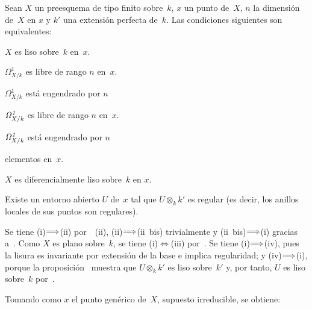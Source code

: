 \begin{theoreme}
\label{II.5.5}
Sean $X$ un preesquema de tipo finito sobre~$k$, $x$ un punto de~$X$, $n$ la dimensión de~$X$ en $x$ y $k'$ una extensión perfecta de~$k$. Las condiciones siguientes son equivalentes:
\begin{enumerate}
\item[(i)] $X$ es liso sobre~$k$ en~$x$.
{\item[(ii)] $\Omega_{X/k}^1$ es libre de rango $n$ en~$x$.
\item[(ii~bis)] $\Omega_{X/k}^1$ está engendrado por $n$}
{\item[(ii)] $\it{\Omega}_{X/k}^1$ es libre de rango $n$ en~$x$.
\item[(ii~bis)] $\it{\Omega}_{X/k}^1$ está engendrado por $n$}
elementos en~$x$.
\item[(iii)] $X$ es diferencialmente liso sobre~$k$ en $x$.
\item[(iv)] Existe un entorno abierto $U$ de~$x$ tal que $U\otimes_k k'$ es regular (es decir, los anillos locales de sus puntos son regulares).
\end{enumerate}
\end{theoreme}

Se tiene (i)$\Longrightarrow$(ii) por~~(ii), (ii)$\Longrightarrow$(ii~bis) trivialmente y (ii~bis)$\Longrightarrow$(i) gracias a~. Como $X$ es plano sobre~$k$, se tiene (i)$\Leftrightarrow$(iii) por~. Se tiene (i)$\Longrightarrow$(iv), pues la lisura es invariante por extensión de la base e implica regularidad; y (iv)$\Longrightarrow$(i), porque la proposición~ muestra que $U\otimes_k k'$ es liso sobre~$k'$ y, por tanto, $U$ es liso sobre~$k$ por~.

Tomando como $x$ el punto genérico de~$X$, supuesto irreducible, se obtiene:

